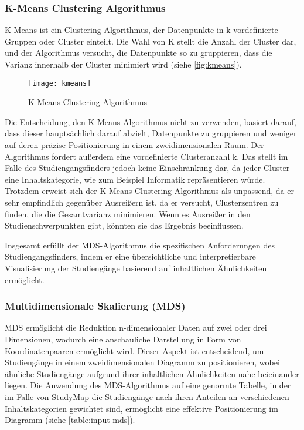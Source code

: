 \subsubsection{K-Means Clustering Algorithmus}
K-Means ist ein Clustering-Algorithmus, der Datenpunkte in k vordefinierte
Gruppen oder Cluster einteilt. Die Wahl von K stellt die Anzahl der Cluster dar,
und der Algorithmus versucht, die Datenpunkte so zu gruppieren, dass die Varianz
innerhalb der Cluster minimiert wird (siehe \autoref{fig:kmeans}).
\parencite{kmeans}

\begin{figure}[H]
    \centering
    \texttt{[image: kmeans]}
    \caption{K-Means Clustering Algorithmus}
    \label{fig:kmeans}
\end{figure}

Die Entscheidung, den K-Means-Algorithmus nicht zu verwenden, basiert darauf,
dass dieser hauptsächlich darauf abzielt, Datenpunkte zu gruppieren und weniger
auf deren präzise Positionierung in einem zweidimensionalen Raum. Der
Algorithmus fordert außerdem eine vordefinierte Clusteranzahl k. Das stellt im
Falle des Studiengangsfinders jedoch keine Einschränkung dar, da jeder Cluster
eine Inhaltskategorie, wie zum Beispiel \glqq Informatik\grqq{} repräsentieren
würde. Trotzdem erweist sich der K-Means Clustering Algorithmus als unpassend,
da er sehr empfindlich gegenüber Ausreißern ist, da er versucht, Clusterzentren
zu finden, die die Gesamtvarianz minimieren. Wenn es Ausreißer in den
Studienschwerpunkten gibt, könnten sie das Ergebnis beeinflussen.
\parencite{kmeans-spikes}

Insgesamt erfüllt der MDS-Algorithmus die spezifischen Anforderungen des
Studiengangsfinders, indem er eine übersichtliche und interpretierbare
Visualisierung der Studiengänge basierend auf inhaltlichen Ähnlichkeiten
ermöglicht.

\subsubsection{Multidimensionale Skalierung (MDS)}
MDS ermöglicht die Reduktion n-dimensionaler Daten auf zwei oder drei
Dimensionen, wodurch eine anschauliche Darstellung in Form von Koordinatenpaaren
ermöglicht wird. Dieser Aspekt ist entscheidend, um Studiengänge in einem
zweidimensionalen Diagramm zu positionieren, wobei ähnliche Studiengänge
aufgrund ihrer inhaltlichen Ähnlichkeiten nahe beieinander liegen. Die Anwendung
des MDS-Algorithmus auf eine genormte Tabelle, in der im Falle von StudyMap die 
Studiengänge nach ihren Anteilen an verschiedenen Inhaltskategorien gewichtet
sind, ermöglicht eine effektive Positionierung im Diagramm
(siehe \autoref{table:input-mds}).

